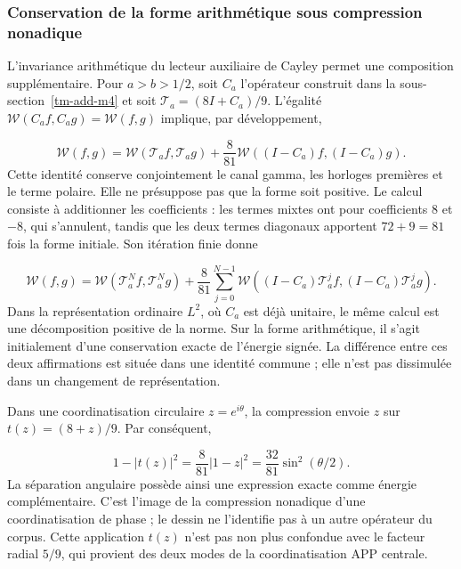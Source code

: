 \subsubsection{Conservation de la forme arithmétique sous compression nonadique}
\label{tm-add-c4-1}
L'invariance arithmétique du lecteur auxiliaire de Cayley permet une composition supplémentaire. Pour \(a>b>1/2\), soit \(C_a\) l'opérateur construit dans la sous-section~\ref{tm-add-m4} et soit \(\mathcal T_a=(8I+C_a)/9\). L'égalité \(\mathscr W(C_af,C_ag)=\mathscr W(f,g)\) implique, par développement,

\begin{equation}
\boxed{\mathscr W(f,g)=\mathscr W(\mathcal T_af,\mathcal T_ag)
+\frac8{81}\mathscr W((I-C_a)f,(I-C_a)g).}
\label{tm-add-balance-aritmetico}
\end{equation}
Cette identité conserve conjointement le canal gamma, les horloges premières et le terme polaire. Elle ne présuppose pas que la forme soit positive. Le calcul consiste à additionner les coefficients : les termes mixtes ont pour coefficients \(8\) et \(-8\), qui s'annulent, tandis que les deux termes diagonaux apportent \(72+9=81\) fois la forme initiale. Son itération finie donne

\begin{equation}
\mathscr W(f,g)=\mathscr W(\mathcal T_a^Nf,\mathcal T_a^Ng)
+\frac8{81}\sum_{j=0}^{N-1}
\mathscr W((I-C_a)\mathcal T_a^jf,(I-C_a)\mathcal T_a^jg).
\label{tm-add-balance-iterado}
\end{equation}
Dans la représentation ordinaire \(L^2\), où \(C_a\) est déjà unitaire, le même calcul est une décomposition positive de la norme. Sur la forme arithmétique, il s'agit initialement d'une conservation exacte de l'énergie signée. La différence entre ces deux affirmations est située dans une identité commune ; elle n'est pas dissimulée dans un changement de représentation.

Dans une coordinatisation circulaire \(z=e^{i\theta}\), la compression envoie \(z\) sur \(t(z)=(8+z)/9\). Par conséquent,

\[
1-|t(z)|^2=\frac8{81}|1-z|^2
=\frac{32}{81}\sin^2(\theta/2).
\]
La séparation angulaire possède ainsi une expression exacte comme énergie complémentaire. C'est l'image de la compression nonadique d'une coordinatisation de phase ; le dessin ne l'identifie pas à un autre opérateur du corpus. Cette application \(t(z)\) n'est pas non plus confondue avec le facteur radial \(5/9\), qui provient des deux modes de la coordinatisation APP centrale.

